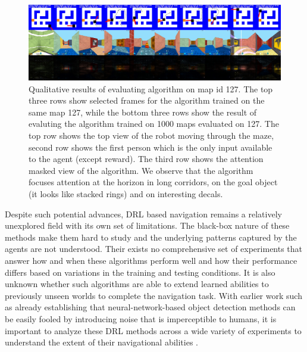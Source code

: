 \begin{figure}
\includegraphics[width=\textwidth]{./exp-results/training-09x09-0127-on-0127.png}
\caption{Qualitative results of evaluating algorithm on map id 127. The top three rows show selected frames for the algorithm trained on the same map 127, while the bottom three rows show the result of evaluting the algorithm trained on 1000 maps evaluated on 127. The top row shows the top view of the robot moving through the maze, second row shows the first person which is the only input available to the agent (except reward). The third row shows the attention masked view of the algorithm. We observe that the algorithm focuses attention at the horizon in long corridors, on the goal object (it looks like stacked rings) and on interesting decals.}
\label{fig:training-qualitative}
\end{figure}

Despite such potential advances, DRL based navigation remains a relatively unexplored field with its own set of limitations. 
The black-box nature of these methods make them hard to study and the underlying patterns captured by the agents are not understood. 
Their exists no comprehensive set of experiments that answer how and when these algorithms perform well and how their performance differs based on variations in the training and testing conditions. 
It is also unknown whether such algorithms are able to extend learned abilities to previously unseen worlds to complete the navigation task.
With earlier work such as \cite{NgYoClCVPR2015} already establishing that  neural-network-based object detection methods can be easily fooled by introducing noise that is imperceptible to humans, it is important to analyze these DRL methods across a wide variety of experiments to understand the extent of their navigational abilities \cite{MiPaViICLR2017}.

